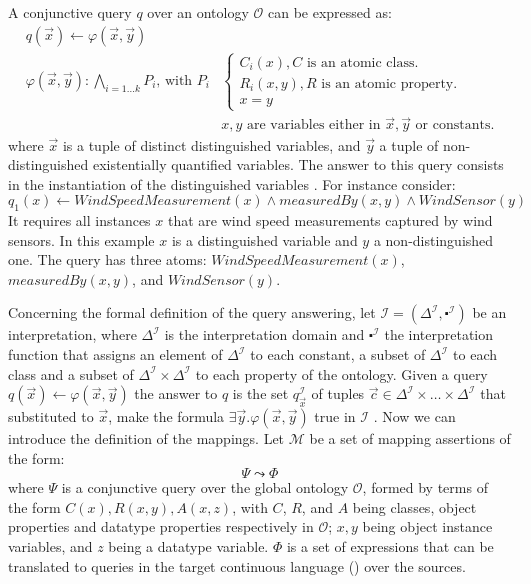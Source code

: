 A conjunctive query $q$ over an ontology $\mathcal{O}$ can be expressed as:
\begin{align*}
q(\vec{x}) \leftarrow \varphi(\vec{x},\vec{y}) \\
%
\varphi(\vec{x},\vec{y}):\underset{i=1...k}{\bigwedge}P_i \mbox{, with } P_i &\begin{cases} C_i(x),   C \mbox{ is an atomic class. } \\
  R_i(x,y),   R \mbox{ is an atomic property.}\\ x=y
\end{cases}
\\&x,y \mbox{ are variables either in $\vec{x}, \vec{y}$ or constants.}
\end{align*}
%
where $\vec{x}$ is a tuple of distinct distinguished variables, and $\vec{y}$ a tuple of non-distinguished existentially quantified variables. 
The answer to this query consists in the instantiation of the distinguished variables
\cite{Calvanese_05}. 
For instance consider:
\begin{equation*}
q_1(x) \leftarrow WindSpeedMeasurement(x)\wedge measuredBy(x,y)\wedge WindSensor(y)
\end{equation*}
It requires all instances $x$ that are wind speed measurements captured by wind sensors.
In this example $x$ is a distinguished variable and $y$ a non-distinguished one. 
The query has three atoms: $WindSpeedMeasurement(x)$, $measuredBy(x,y)$, and $WindSensor(y)$.

Concerning the formal definition of the query answering, let $\mathcal{I}=(\Delta^\mathcal{I} ,\centerdot^\mathcal{I})$ be an interpretation, where $\Delta^\mathcal{I}$ is the interpretation domain and $\centerdot^\mathcal{I}$ the interpretation function that assigns an element of $\Delta^\mathcal{I}$ to each constant, a subset of $\Delta^\mathcal{I}$ to each class and a subset of $\Delta^\mathcal{I} \times \Delta^\mathcal{I}$ to each property of the ontology.
Given a query $q(\vec{x})\leftarrow \varphi(\vec{x},\vec{y})$ the answer to $q$ is the set $q^{\mathcal{I}}_{\vec{x}}$ of tuples $\vec{c} \in \Delta^\mathcal{I} \times \dots \times \Delta^\mathcal{I}$ that substituted to $\vec{x}$, make the formula $\exists\vec{y}.\varphi(\vec{x},\vec{y})$ true in $\mathcal{I}$ \cite{Calvanese_05,Poggi_08,Lubyte_09}.
Now we can introduce the definition of the mappings. 
Let $\mathcal{M}$ be a set of mapping assertions of the form:
\begin{equation*}
\Psi \leadsto \Phi
\end{equation*}
where $\Psi$ is a conjunctive query over the global ontology $\mathcal{O}$, formed by terms of the form $C(x), R(x,y), A(x,z)$, with $C$, $R$, and $A$ being classes, object properties and datatype properties respectively in $\mathcal{O}$; $x, y$ being object instance variables, and $z$ being a datatype variable. 
$\Phi$ is a set of expressions that can be translated to queries in the target continuous language (\eg \sneeql) over the sources.

